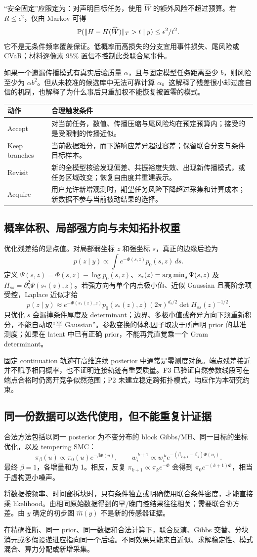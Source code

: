 “安全固定”应限定为：对声明目标任务，使用 $\widehat W$ 的额外风险不超过预算。若 $R\le\epsilon^2$，仅由 Markov 可得
\[
\mathbb P(\|H-H(\widehat W)\|_T>t\mid y)\le\epsilon^2/t^2.
\]
它不是无条件频率覆盖保证。低概率而高损失的分支宜用事件损失、尾风险或 CVaR；材料逐像素 $95\%$ 置信不控制此类联合尾事件。

如果一个遗漏传播模式有真实后验质量 $\alpha$，且与固定模型任务距离至少 $b$，则风险至少为 $\alpha b^2$。但从未校准的候选库中无法可靠计算 $\alpha$。这解释了残差很小却过度自信的机制，也解释了为什么事后只重加权不能恢复被置零的模式。

\begin{longtable}{p{28mm}p{120mm}}
\toprule
动作 & 合理触发条件\\
\midrule
Accept & 对当前任务，数值、传播压缩与尾风险均在预定预算内；接受的是受限制的传播近似。\\
Keep branches & 当前数据难分，而下游响应差异超过容差；保留联合分支与条件目标样本。\\
Revisit & 新的全模型核验发现偏差、共振裕度失效、出现新传播模式，或任务区域改变；恢复自由度并重建表示。\\
Acquire & 用户允许新增观测时，期望任务风险下降超过采集和计算成本；新数据不参与当前被动结果的选择。\\
\bottomrule
\end{longtable}

\subsection{概率体积、局部强方向与未知拓扑权重}
优化残差给的是点值。对局部弱坐标 $z$ 和强坐标 $s$，真正的边缘后验为
\[
p(z\mid y)\propto\int
e^{-\Phi(s,z)}p_0(s,z)\,ds.
\]
定义 $\Psi(s,z)=\Phi(s,z)-\log p_0(s,z)$、$s_*(z)=\operatorname*{arg\,min}_s\Psi(s,z)$ 及 $H_{ss}=\partial_s^2\Psi(s_*(z),z)$。若强方向有单个内点极小值、近似 Gaussian 且高阶余项受控，Laplace 近似才给
\[
p(z\mid y)\approx
e^{-\Phi(s_*(z),z)}p_0(s_*(z),z)
(2\pi)^{d_s/2}\det H_{ss}(z)^{-1/2}.
\]
只优化 $s$ 会漏掉条件厚度及 determinant；边界、多极小值或奇异方向下须重新积分，不能自动取“半 Gaussian”。参数变换的体积因子取决于所声明 prior 的基准测度；如果在 latent 中已有正确 prior，不能再凭直觉乘一个 Gram determinant。

固定 continuation 轨迹在高维连续 posterior 中通常是零测度对象。端点残差接近并不赋予相同概率，也不证明连接轨迹有重要质量。F3 已验证自然参数线段可在端点合格时仍离开竞争似然范围；P2 未建立稳定跨拓扑模式，均应作为本研究约束。\cite{R_F3,R_P2}

\subsection{同一份数据可以迭代使用，但不能重复计证据}
合法方法包括以同一 posterior 为不变分布的 block Gibbs/MH、同一目标的坐标优化，以及 tempering SMC：
\[
\pi_\beta(u)\propto\pi_0(u)e^{-\beta\Phi(u)},\qquad
w_i^{\,k+1}\propto w_i^{\,k}
e^{-(\beta_{k+1}-\beta_k)\Phi(u_i)}.
\]
最终 $\beta=1$，各增量和为 1。相反，反复 $\pi_{k+1}\propto\pi_k e^{-\Phi}$ 会得到 $\pi_0e^{-(k+1)\Phi}$，相当于虚构更小噪声。

将数据按频率、时间窗拆块时，只有条件独立或明确使用联合条件密度，才能直接乘 likelihood。由相同原始数据得到的早/晚门控结果往往相关；需要联合协方差。由 $y$ 确定的初步图 $\widehat m(y)$ 不是新的传感器证据。

在精确推断、同一 prior、同一数据和合法计算下，联合反演、Gibbs 交替、分块消元或多假设递进应指向同一个后验。不同效果只能来自近似、求解稳定性、模式混合、算力分配或新增采集。

